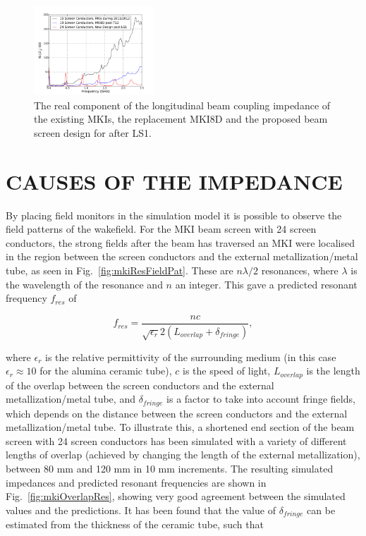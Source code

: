 \documentclass{JAC2003}
\begin{document}
\begin{figure}
\begin{center}\includegraphics[width=0.4\textwidth]{TUPME033f3.pdf}
\caption{The real component of the longitudinal beam coupling impedance of the existing MKIs, the replacement MKI8D and the proposed beam screen design for after LS1.}
\label{fig:MKIScreenImp}
\end{center}
\end{figure}

\section{CAUSES OF THE IMPEDANCE}

By placing field monitors in the simulation model it is possible to observe the field patterns of the wakefield. For the MKI beam screen with 24 screen conductors, the strong fields after the beam has traversed an MKI were localised in the region between the screen conductors and the external metallization/metal tube, as seen in Fig.~\ref{fig:mkiResFieldPat}. These are $n \lambda /2$ resonances, where $\lambda$ is the wavelength of the resonance and $n$ an integer. This gave a predicted resonant frequency $f_{res}$ of 

\begin{equation}
f_{res} = \frac{nc}{\sqrt{\epsilon_{r}}2 \left( L_{overlap} + \delta_{fringe} \right)},
\label{eqn:imp-overlap-fres}
\end{equation}

where $\epsilon_{r}$ is the relative permittivity of the surrounding medium (in this case $\epsilon_{r} \approx 10$ for the alumina ceramic tube), $c$ is the speed of light, $L_{overlap}$ is the length of the overlap between the screen conductors and the external metallization/metal tube, and $\delta_{fringe}$ is a factor to take into account fringe fields, which depends on the distance between the screen conductors and the external metallization/metal tube. To illustrate this, a shortened end section of the beam screen with 24 screen conductors has been simulated with a variety of different lengths of overlap (achieved by changing the length of the external metallization), between 80 mm and 120 mm in 10 mm increments. The resulting simulated impedances and predicted resonant frequencies are shown in Fig.~\ref{fig:mkiOverlapRes}, showing very good agreement between the simulated values and the predictions. It has been found that the value of $\delta_{fringe}$ can be estimated from the thickness of the ceramic tube, such that
\end{document}
